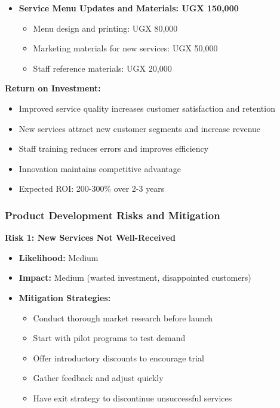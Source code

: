\documentclass[a4paper,12pt]{article}
\begin{document}
\begin{itemize}[leftmargin=2em]
    \item \textbf{Service Menu Updates and Materials: UGX 150,000}
    \begin{itemize}
        \item Menu design and printing: UGX 80,000
        \item Marketing materials for new services: UGX 50,000
        \item Staff reference materials: UGX 20,000
    \end{itemize}
\end{itemize}

\textbf{Return on Investment:}
\begin{itemize}[leftmargin=2em]
    \item Improved service quality increases customer satisfaction and retention
    \item New services attract new customer segments and increase revenue
    \item Staff training reduces errors and improves efficiency
    \item Innovation maintains competitive advantage
    \item Expected ROI: 200-300\% over 2-3 years
\end{itemize}

\subsubsection{Product Development Risks and Mitigation}

\textbf{Risk 1: New Services Not Well-Received}
\begin{itemize}[leftmargin=2em]
    \item \textbf{Likelihood:} Medium
    \item \textbf{Impact:} Medium (wasted investment, disappointed customers)
    \item \textbf{Mitigation Strategies:}
    \begin{itemize}
        \item Conduct thorough market research before launch
        \item Start with pilot programs to test demand
        \item Offer introductory discounts to encourage trial
        \item Gather feedback and adjust quickly
        \item Have exit strategy to discontinue unsuccessful services
    \end{itemize}
\end{itemize}
\end{document}
